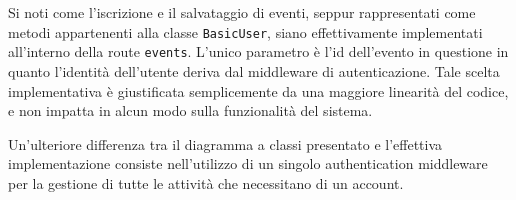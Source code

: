 \documentclass[9pt]{extarticle}
\begin{document}
Si noti come l'iscrizione e il salvataggio di eventi, seppur rappresentati come metodi appartenenti alla classe \verb*|BasicUser|, siano effettivamente implementati all'interno della route \verb*|events|. L'unico parametro è l'id dell'evento in questione in quanto l'identità dell'utente deriva dal middleware di autenticazione. Tale scelta implementativa è giustificata semplicemente da una maggiore linearità del codice, e non impatta in alcun modo sulla funzionalità del sistema.

Un'ulteriore differenza tra il diagramma a classi presentato e l'effettiva implementazione consiste nell'utilizzo di un singolo authentication middleware per la gestione di tutte le attività che necessitano di un account.
\end{document}
